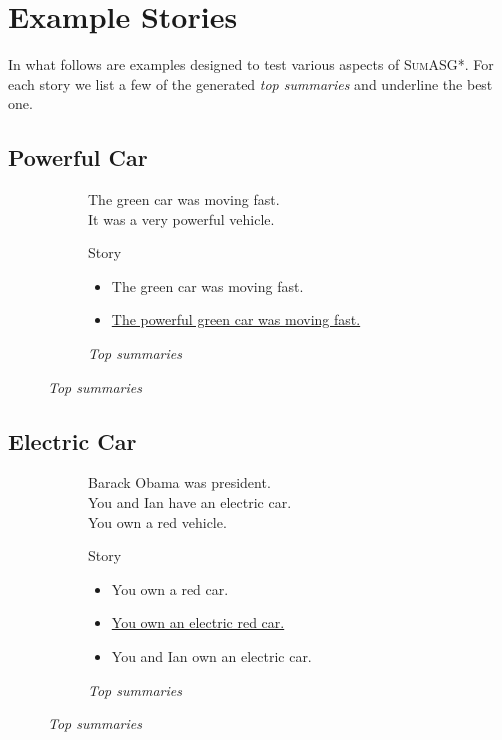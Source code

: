 \chapter{Example Stories}
\label{appendix:stories}

\titlespacing*{\section}
  {0pt}{\baselineskip}{0.5\baselineskip}

In what follows are examples designed to test various aspects of \textsc{SumASG*}. For each story we list a few of the generated \textit{top summaries} and underline the best one.

\section*{Powerful Car}

\begin{figure}[H]
\begin{subfigure}{0.5\textwidth}
\begin{displayquote}
The green car was moving fast.\\
It was a very powerful vehicle.
\end{displayquote}
\caption{Story}
\end{subfigure}
\begin{subfigure}{0.5\textwidth}
\begin{itemize}[nolistsep]
\item The green car was moving fast.
\item \underline{The powerful green car was moving fast.}
\end{itemize}
\vspace{\topsep}
\caption{\textit{Top summaries}}
\end{subfigure}
\end{figure}

\section*{Electric Car}

\begin{figure}[H]
\begin{subfigure}{0.52\textwidth}
\begin{displayquote}
Barack Obama was president.\\
You and Ian have an electric car.\\
You own a red vehicle.
\end{displayquote}
\caption{Story}
\end{subfigure}
\begin{subfigure}{0.48\textwidth}
\begin{itemize}[nolistsep]
\item You own a red car.
\item \ul{You own an electric red car.}
\item You and Ian own an electric car.
\end{itemize}
\vspace{\topsep}
\caption{\textit{Top summaries}}
\end{subfigure}
\end{figure}

